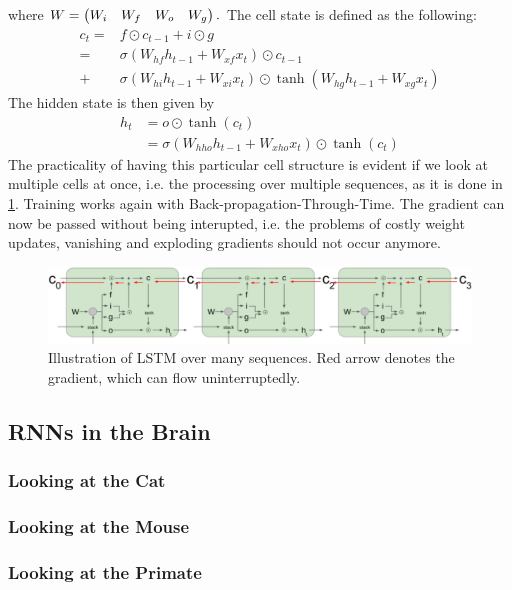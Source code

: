 \documentclass[main]{subfiles}
\begin{document}
where $W = \begin{pmatrix}W_i& W_f& W_o& W_g\end{pmatrix}.$ The cell state is defined as the following:
\begin{align*}
    c_t = & f \odot c_{t-1} + i \odot g \\
    = &\sigma ( W_{hf} h_{t-1} + W_{xf} x_t ) \odot c_{t-1}\\ 
    + &\sigma ( W_{hi} h_{t-1} + W_{xi} x_t ) \odot \tanh (W_{hg} h_{t-1} + W_{xg} x_t)
\end{align*}
The hidden state is then given by 
\begin{align*}
    h_t &= o \odot \tanh(c_t)\\
    &= \sigma (W_{hho} h_{t-1} + W_{xho} x_t ) \odot \tanh(c_t)
\end{align*}
The practicality of having this particular cell structure is evident if we look at multiple cells at once, i.e. the processing over multiple sequences, as it is done in \cref{fig:lstm_many}. Training works again with Back-propagation-Through-Time. The gradient can now be passed without being interupted, i.e. the problems of costly weight updates, vanishing and exploding gradients should not occur anymore. 
\begin{figure}[H]
    \centering
    \includegraphics[width=0.99\linewidth]{13_LearningInRecurrentNeuronalNetworks/figures/lstm_many.png}
    \caption{Illustration of LSTM over many sequences. Red arrow denotes the gradient, which can flow uninterruptedly.}
    \label{fig:lstm_many}
\end{figure}





\subsection{RNNs in the Brain}
\subsubsection{Looking at the Cat}
\subsubsection{Looking at the Mouse}
\subsubsection{Looking at the Primate}
\end{document}
